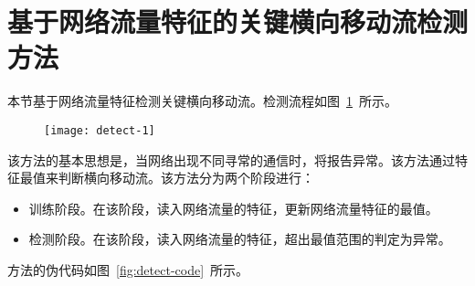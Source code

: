 {\section{基于网络流量特征的关键横向移动流检测方法}

本节基于网络流量特征检测关键横向移动流。检测流程如图~\ref{fig:detect-1}~所示。

\begin{figure}[!htbp]
    \centering
    \texttt{[image: detect-1]}
    \label{fig:detect-1}

\end{figure}

该方法的基本思想是，当网络出现不同寻常的通信时，将报告异常。该方法通过特征最值来判断横向移动流。该方法分为两个阶段进行：

\begin{itemize}
    \item 训练阶段。在该阶段，读入网络流量的特征，更新网络流量特征的最值。
    \item 检测阶段。在该阶段，读入网络流量的特征，超出最值范围的判定为异常。
\end{itemize}

方法的伪代码如图~\ref{fig:detect-code}~所示。

}
